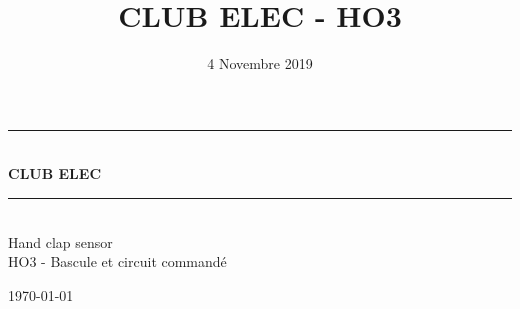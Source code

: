 \documentclass{article}
\title{CLUB ELEC - HO3}
\author{}
\date{4 Novembre 2019}
\begin{document}
\begin{titlepage}
\begin{center}

\rule{\linewidth}{0.5mm} \\[0.4cm]
{ \huge \bfseries \textsc{CLUB ELEC}\\[0.4cm] }
\rule{\linewidth}{0.5mm} \\[2cm]

{\huge Hand clap sensor}\\[0.6cm]
{\large HO3 - Bascule et circuit commandé}\\[3cm]


\vspace{12cm}

{\large  \today}

\end{center}
\end{titlepage}



\clearpage

\clearpage



% 
% 
\end{document}
